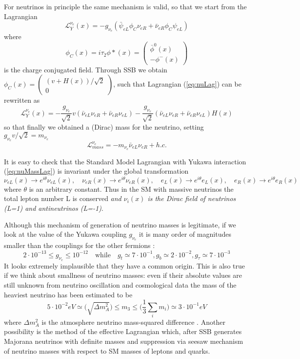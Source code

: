 \documentclass{subnucbo}
\begin{document}
For neutrinos in principle the same mechanism is valid, so that we start from the Lagrangian
\begin{equation}
\label{eq:nuLag}
\mathcal{L}_Y^{\nu_e}(x)=-g_{\nu_e}(\bar{\psi}_{eL}\phi_C \nu_{eR}+\bar{\nu}_{eR}\phi_C \psi_{eL})
\end{equation}
where
\begin{equation}
\phi_C(x)=i\tau_2\phi*(x)=\begin{pmatrix}\bar{\phi}^0(x) \\ -\phi^-(x)\end{pmatrix}
\end{equation}
is the charge conjugated field. Through SSB we obtain $\phi_C(x)=\begin{pmatrix}(v+H(x))/\sqrt{2}\\0\end{pmatrix}$, such that Lagrangian (\ref{eq:nuLag}) can be rewritten as
\begin{equation}
\label{eq:nuMassLag}
\mathcal{L}_Y^{\nu_e}(x)=-\frac{g_{\nu_e}}{\sqrt{2}}v(\bar{\nu}_{eL}\nu_{eR}+\bar{\nu}_{eR}\nu_{eL})-\frac{g_{\nu_e}}{\sqrt{2}}(\bar{\nu}_{eL}\nu_{eR}+\bar{\nu}_{eR}\nu_{eL})H(x)
\end{equation}
so that finally we obtained a (Dirac) mass for the neutrino, setting $g_{\nu_e}v/\sqrt{2}=m_{\nu_e}$
\begin{equation}
\mathcal{L}_{mass}^{\nu_e}=-m_{\nu_e}\bar{\nu}_{eL}\nu_{eR}+h.c.
\end{equation}

It is easy to check that the Standard Model Lagrangian with Yukawa interaction (\ref{eq:nuMassLag}) is invariant under the global transformation
\[
\nu_{eL}(x)\rightarrow e^{i\theta}\nu_{eL}(x),\quad\nu_{eR}(x)\rightarrow e^{i\theta}\nu_{eR}(x),
\quad e_L(x)\rightarrow e^{i\theta}e_L(x),\quad e_R(x)\rightarrow e^{i\theta}e_R(x)
\]
where $\theta$ is an arbitrary constant. Thus in the SM with massive neutrinos the total lepton number L is conserved  \emph{and $\nu_i(x)$ is the Dirac field of neutrinos (L=1) and antineutrinos (L=-1)}.

Although this mechanism of generation of neutrino masses is legitimate, if we look at the value of the Yukawa coupling $g_{\nu_e}$ it is many order of magnitudes smaller than the couplings for the other fermions \cite{ref:Bil}:
\[
2\cdot10^{-13}\leq g_{\nu_e}\leq10^{-12} \quad \text{while}\quad g_t\simeq7\cdot10^{-1}, g_b\simeq2\cdot10^{-2}, g_{\tau}\simeq7\cdot10^{-3}
\]
It looks extremely implausible that they have a common origin. This is also true if we think about smallness of neutrino masses: even if their absolute values are still unknown from neutrino oscillation and cosmological data the mass of the heaviest neutrino has been estimated to be
\[
5\cdot10^{-2}eV\simeq\biggl(\sqrt{\Delta m^2_A}\biggr)\leq m_3\leq\biggl(\frac{1}{3}\sum_im_i\biggr)\simeq3\cdot10^{-1}eV
\]
where $\Delta m^2_A$ is the atmosphere neutrino mass-squared difference \cite{ref:Bil}.
Another possibility is the method of the effective Lagrangian which, after SSB generates Majorana neutrinos with definite masses and suppression via seesaw mechanism of neutrino masses with respect to SM masses of leptons and quarks.
\end{document}
